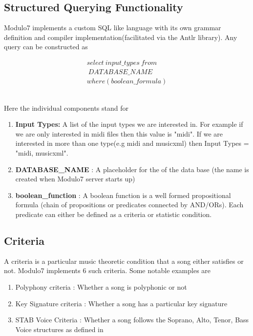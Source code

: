 \documentclass{article}
\begin{document}
\subsection{Structured Querying Functionality} \label{structuredquery}

\noindent Modulo7 implements a custom SQL like language with its own grammar definition and compiler implementation(facilitated via the Antlr library). Any query can be constructed as 

\begin{equation}
\begin{aligned}
select \ input\_types \ from \\\ DATABASE\_NAME \\ where (boolean\_formula)
\end{aligned}
\end{equation}

\noindent \\ Here the individual components stand for 

\begin{enumerate}
\item \textbf{Input Types: } A list of the input types we are interested in. For example if we are only interested in midi files then this value is "midi". If we are interested in more than one type(e.g midi and musicxml) then Input Types = "midi, musicxml". 
\item \textbf{DATABASE\_NAME} : A placeholder for the of the data base (the name is created when Modulo7 server starts up)
\item \textbf{boolean\_function} : A boolean function is a well formed propositional formula (chain of propositions or predicates connected by AND/ORs). Each predicate can either be defined as a criteria or statistic condition.   
\end{enumerate}

\subsection{Criteria}

A criteria is a particular music theoretic condition that a song either satisfies or not. Modulo7 implements 6 such criteria. Some notable examples are 

\begin{enumerate}
\item Polyphony criteria : Whether a song is polyphonic or not
\item Key Signature criteria : Whether a song has a particular key signature
\item STAB Voice Criteria : Whether a song follows the Soprano, Alto, Tenor, Bass Voice structures as defined in \cite{satbcriteria}
\end{enumerate}
\end{document}

